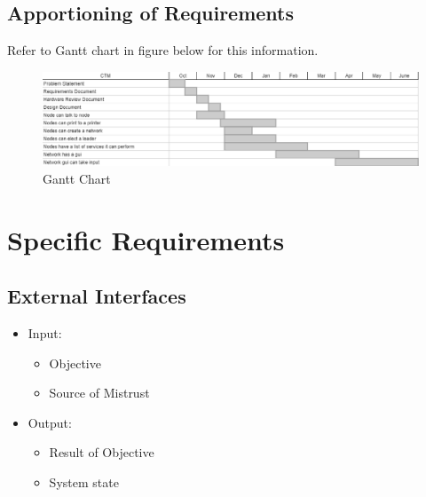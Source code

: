 \documentclass[draftclsnofoot, onecolumn, compsoc, 10pt]{IEEEtran}
\begin{document}
\subsection{Apportioning of Requirements}
Refer to Gantt chart in figure below for this information.
\begin{landscape}
	\begin{figure}[!htb]
		\caption{Gantt Chart}
		\centering
			\includegraphics[scale=.7]{chart.eps}
	\end{figure}
\end{landscape}
\FloatBarrier

\section{Specific Requirements}
\subsection{External Interfaces}
\begin{itemize}
\item Input:
	\begin{itemize}
	\item Objective 
    \item Source of Mistrust
	\end{itemize}
\item Output:
	\begin{itemize}
	\item Result of Objective
    \item System state
	\end{itemize}
\end{itemize}
\end{document}
